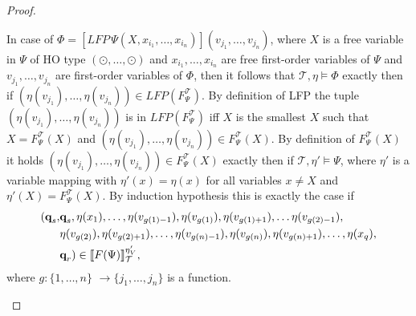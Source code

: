 \begin{proof}
\begin{compactitem}
        \item In case of $\Phi = [LFP\,\Psi(X, x_{i_1}, \dots, x_{i_n})](v_{j_1}, \dots, v_{j_n})$, where $X$ is a
        free variable in $\Psi$ of HO type $(\odot, \dots, \odot)$ and $x_{i_1}, \dots, x_{i_n}$ are free first-order
        variables of $\Psi$ and $v_{j_1}, \dots, v_{j_n}$ are first-order variables of $\Phi$, then it follows that
        $\mathcal{T}, \eta \models \Phi$ exactly then if $(\eta(v_{j_1}), \dots, \eta(v_{j_n})) \in LFP
        (F_\Psi^\mathcal{T})$. By definition of LFP the tuple $(\eta(v_{j_1}), \dots, \eta(v_{j_n}))$ is in
        $LFP(F_\Psi^\mathcal{T})$ iff $X$ is the smallest $X$ such that $X = F_\Psi^\mathcal{T}(X)$ and $(\eta(v_{j_1}), \dots, \eta(v_{j_n})) \in
        F_\Psi^\mathcal{T}(X)$. By definition of $F_\Psi^\mathcal{T}(X)$ it holds $(\eta
        (v_{j_1}), \dots, \eta(v_{j_n})) \in F_\Psi^\mathcal{T}(X)$ exactly then if $\mathcal{T}, \eta' 
        \models \Psi$, where $\eta'$ is a variable mapping with $\eta'(x) = \eta(x)$ for all variables $x \neq X$ and $\eta'(X) = F_\Psi^\mathcal{T}(X)$. By induction hypothesis this is exactly the case if
        \begin{align*}
        (\emph{q}_s, &\emph{q}_s, \eta(x_1), \dots, \eta(v_{g(1)-1}), \eta(v_{g(1)}), \eta(v_{g(1)+1}), \dots \eta(v_{g(2)-1}),\\& \eta
            (v_{g(2)}), \eta(v_{g(2)+1}), \dots, \eta(v_{g(n)-1}), \eta(v_{g(n)}), \eta(v_{g(n)+1}), \dots, \eta
            (x_q), \\& \emph{q}_r) \in \llbracket
        F(\Psi) \rrbracket^{\eta'_V}_\mathcal{T},
        \end{align*}
         where $g: \{1, \dots, n\} $ $\rightarrow \{j_1, \dots, j_n\}$ is a function.
        

\end{compactitem}
\end{proof}
